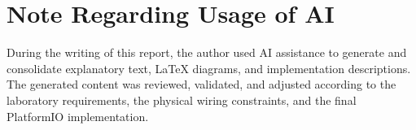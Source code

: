 \section{Note Regarding Usage of AI}

During the writing of this report, the author used AI assistance to generate and consolidate explanatory text, LaTeX diagrams, and implementation descriptions. The generated content was reviewed, validated, and adjusted according to the laboratory requirements, the physical wiring constraints, and the final PlatformIO implementation.
